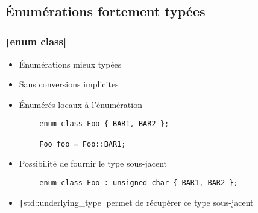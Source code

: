 \documentclass[C++.tex]{subfiles}
\begin{document}
\subsection*{Énumérations fortement typées}
\begin{frame}[fragile]
	\frametitle{\texttt|enum class|}
	\begin{itemize}
		\item Énumérations mieux typées
		\item Sans conversions implicites


		\item Énumérés locaux à l'énumération
	\end{itemize}

	\begin{verbatim}
		enum class Foo { BAR1, BAR2 };

		Foo foo = Foo::BAR1;
	\end{verbatim}

	\begin{itemize}
		\item Possibilité de fournir le type sous-jacent

	\end{itemize}

	\begin{verbatim}
		enum class Foo : unsigned char { BAR1, BAR2 };
	\end{verbatim}

	\begin{itemize}
		\item \texttt|std::underlying_type| permet de récupérer ce type sous-jacent
	\end{itemize}



\end{frame}
\end{document}
